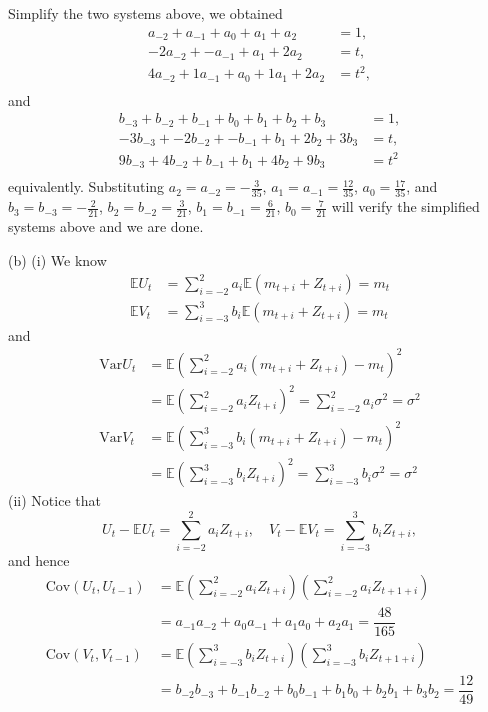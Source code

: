 \documentclass[lang=en,11pt,a4paper,citestyle =authoryear]{elegantpaper}
\begin{document}
Simplify the two systems above, we obtained
\[
\begin{aligned}
    a_{-2} + a_{-1} + a_0 + a_1 + a_2 &= 1, \\
    -2a_{-2} + -a_{-1} + a_1 + 2a_2 &= t, \\
    4a_{-2} + 1a_{-1} + a_0 + 1a_1 + 2a_2 &= t^2,\\
\end{aligned}
\]
and
\[
\begin{aligned}
    b_{-3} + b_{-2} + b_{-1} + b_0 + b_1 + b_2 + b_3&= 1, \\
    -3b_{-3} + -2b_{-2} + -b_{-1} + b_1 + 2b_2 + 3b_3&= t, \\
    9b_{-3} + 4b_{-2} + b_{-1} + b_1 + 4b_2 + 9b_3&= t^2\\
\end{aligned}
\]
equivalently. Substituting $a_2 = a_{-2} = -\tfrac{3}{35}$, $a_1 = a_{-1} = \tfrac{12}{35}$, $a_0 = \tfrac{17}{35}$, and $b_3 = b_{-3} = -\tfrac{2}{21}$, $b_2 = b_{-2} = \tfrac{3}{21}$, $b_1 = b_{-1} = \tfrac{6}{21}$, $b_0 = \tfrac{7}{21}$ will verify the simplified systems above and we are done.\par
(b) (i) We know
\[
\begin{aligned}
    \mathbb{E}U_t &= \sum\limits_{i=-2}^2 a_i \mathbb{E}(m_{t+i} + Z_{t+i}) = m_t \\
    \mathbb{E}V_t &= \sum\limits_{i=-3}^3 b_i \mathbb{E}(m_{t+i} + Z_{t+i}) = m_t
\end{aligned}
\]
and
\[
\begin{aligned}
    \text{Var}U_t &= \mathbb{E}\left(\sum\limits_{i=-2}^2 a_i (m_{t+i} + Z_{t+i})-m_t\right)^2 \\
    &= \mathbb{E}\left(\sum\limits_{i=-2}^2 a_i Z_{t+i}\right)^2 =\sum\limits_{i=-2}^2 a_i \sigma^2 = \sigma^2 \\
    \text{Var}V_t &= \mathbb{E}\left(\sum\limits_{i=-3}^3 b_i (m_{t+i} + Z_{t+i})-m_t\right)^2 \\
    &= \mathbb{E}\left(\sum\limits_{i=-3}^3 b_i Z_{t+i}\right)^2 =\sum\limits_{i=-3}^3 b_i \sigma^2 = \sigma^2
\end{aligned}
\]
(ii) Notice that
\[
U_t - \mathbb{E}U_t = \sum\limits_{i=-2}^2 a_iZ_{t+i},\quad V_t - \mathbb{E}V_t = \sum\limits_{i=-3}^3 b_iZ_{t+i},
\]
and hence
\[
\begin{aligned}
    \text{Cov}(U_t,U_{t-1}) &= \mathbb{E}\left(\sum\limits_{i=-2}^2 a_iZ_{t+i}\right)\left(\sum\limits_{i=-2}^2 a_iZ_{t+1+i}\right) \\
    &= a_{-1}a_{-2} + a_0a_{-1} + a_1a_0 + a_2a_1 = \dfrac{48}{165} \\
    \text{Cov}(V_t,V_{t-1}) &= \mathbb{E}\left(\sum\limits_{i=-3}^3 b_iZ_{t+i}\right)\left(\sum\limits_{i=-3}^3 b_iZ_{t+1+i}\right) \\
    &= b_{-2}b_{-3} + b_{-1}b_{-2} + b_0b_{-1} + b_1b_0 + b_2b_1 + b_3b_2= \dfrac{12}{49} \\
\end{aligned}
\]
\end{document}
